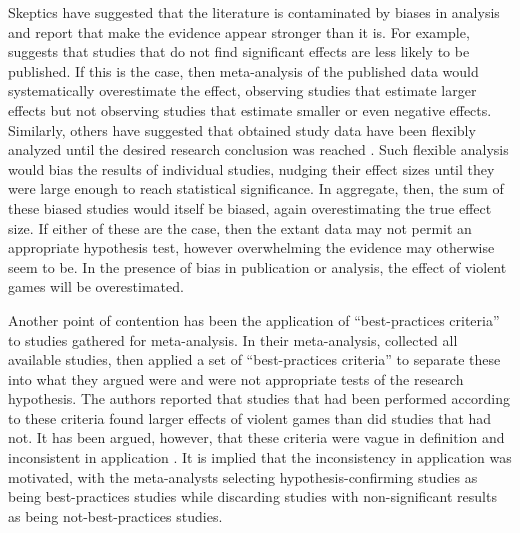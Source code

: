 \documentclass[man]{apa6}
\begin{document}
Skeptics have suggested that the literature is contaminated by biases in analysis and report that make the evidence appear stronger than it is. For example,  \citet{Ferguson:2007a} suggests that studies that do not find significant effects are less likely to be published. If this is the case, then meta-analysis of the published data would systematically overestimate the effect, observing studies that estimate larger effects but not observing studies that estimate smaller or even negative effects. 
Similarly, others have suggested that obtained study data have been flexibly analyzed until the desired research conclusion was reached \citep{Elson:etal:2014;Ferguson:CITATION:NEEDED}. Such flexible analysis would bias the results of individual studies, nudging their effect sizes until they were large enough to reach statistical significance. In aggregate, then, the sum of these biased studies would itself be biased, again overestimating the true effect size.
If either of these are the case, then the extant data may not permit an appropriate hypothesis test, however overwhelming the evidence may otherwise seem to be. In the presence of bias in publication or analysis, the effect of violent games will be overestimated.

Another point of contention has been the application of ``best-practices criteria'' to studies gathered for meta-analysis. In their meta-analysis, \citet{Anderson:etal:2010} collected all available studies, then applied a set of ``best-practices criteria'' to separate these into what they argued were and were not appropriate tests of the research hypothesis. The authors reported that studies that had been performed according to these criteria found larger effects of violent games than did studies that had not. It has been argued, however, that these criteria were vague in definition and inconsistent in application \citep{Elson:Ferguson:2014,Ferguson:Kilburn:2010}. 
It is implied that the inconsistency in application was motivated, with the meta-analysts selecting hypothesis-confirming studies as being best-practices studies while discarding studies with non-significant results as being not-best-practices studies.
\end{document}
